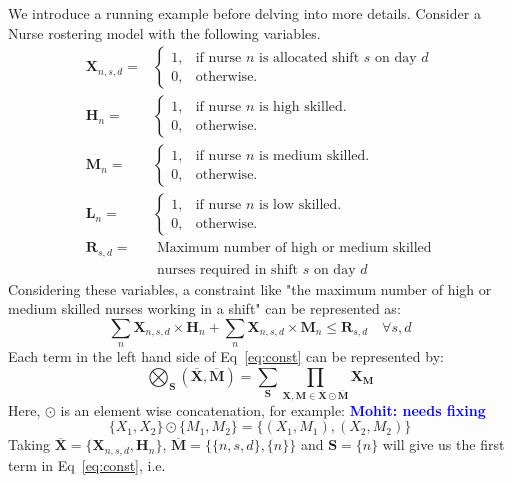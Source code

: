 \documentclass{article}
\newcommand{\mohit}[1]{{\bf \textcolor{blue}{{Mohit: #1}}}}
\newcommand{\TX}{\textbf{X}\xspace}
\newcommand{\TM}{\textbf{M}\xspace}
\begin{document}
We introduce a running example before delving into more details. Consider a Nurse rostering model with the following variables.
%
\begin{align*}
  \TX_{n,s,d} = & \begin{cases}
    1, & \text{if nurse $n$ is allocated shift $s$ on day $d$}\\
    0, & \text{otherwise}.
  \end{cases}\\
  \textbf{H}_{n} = & \begin{cases}
    1, & \text{if nurse $n$ is high skilled}.\\
    0, & \text{otherwise}.
  \end{cases}\\
  \textbf{M}_{n} = & \begin{cases}
    1, & \text{if nurse $n$ is medium skilled}.\\
    0, & \text{otherwise}.
  \end{cases}\\
  \textbf{L}_{n} = & \begin{cases}
    1, & \text{if nurse $n$ is low skilled}.\\
    0, & \text{otherwise}.
  \end{cases}\\
  \textbf{R}_{s,d} =
    & \; \text{Maximum number of high or medium skilled}\\ 
    & \; \text{nurses required in shift $s$ on day $d$}
\end{align*}
%
Considering these variables, a constraint like "the maximum number of high or medium skilled nurses working in a shift" can be represented as:
\begin{equation}
\label{eq:const}
\sum_{n} \TX_{n,s,d} \times \textbf{H}_{n} + \sum_{n} \TX_{n,s,d} \times \textbf{M}_{n} \le \textbf{R}_{s,d} \quad \forall s,d
\end{equation}
Each term in the left hand side of Eq~\ref{eq:const} can be represented by:
\begin{equation}
\label{eq:struct}
	\bigotimes_{\textbf{S}}(\overline{\TX}, \overline{\TM}) = \sum_{\textbf{S}}\prod_{\TX,\TM \in \overline{\TX} \odot \overline{\TM}}\TX_{\TM}
\end{equation}
Here, $\odot$ is an element wise concatenation, for example: {\mohit{needs fixing}}
\begin{equation*}
    \{X_1,X_2\}\odot \{M_1,M_2\}=\{(X_1, M_1), (X_2, M_2)\}
\end{equation*}
Taking $\overline{\TX}=\{\TX_{n,s,d}, \textbf{H}_{n}\}$, $\overline{\TM}=\{\{n,s,d\}, \{n\}\}$ and $\textbf{S}=\{n\}$ will give us the first term in Eq~\ref{eq:const}, i.e. 
\end{document}
